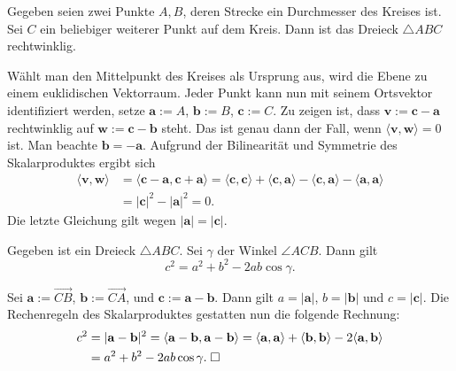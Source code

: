 \newpage
\begin{Satz}\newlinefirst
Gegeben seien zwei Punkte $A,B$, deren Strecke ein Durchmesser
des Kreises ist. Sei $C$ ein beliebiger weiterer Punkt auf dem
Kreis. Dann ist das Dreieck $\triangle ABC$ rechtwinklig.
\end{Satz}
\begin{Beweis}
Wählt man den Mittelpunkt des Kreises als Ursprung aus, wird die
Ebene zu einem euklidischen Vektorraum. Jeder Punkt kann nun mit
seinem Ortsvektor identifiziert werden, setze $\mathbf a := A$,
$\mathbf b := B$, $\mathbf c := C$. Zu zeigen ist, dass
$\mathbf v:=\mathbf c-\mathbf a$ rechtwinklig auf
$\mathbf w:=\mathbf c-\mathbf b$  steht. Das ist genau dann der Fall,
wenn $\langle\mathbf v,\mathbf w\rangle = 0$ ist.
Man beachte $\mathbf b = -\mathbf a$. Aufgrund der Bilinearität und
Symmetrie des Skalarproduktes ergibt sich%
\begin{align}
\langle\mathbf v,\mathbf w\rangle
&= \langle\mathbf c-\mathbf a,\mathbf c+\mathbf a\rangle
= \langle\mathbf c,\mathbf c\rangle
+ \langle\mathbf c,\mathbf a\rangle
- \langle\mathbf c,\mathbf a\rangle
- \langle\mathbf a,\mathbf a\rangle\\
&= |\mathbf c|^2-|\mathbf a|^2 = 0.
\end{align}
Die letzte Gleichung gilt wegen $|\mathbf a|=|\mathbf c|$.\;\qedsymbol
\end{Beweis}

\begin{Satz}[Kosinussatz]\label{Kosinussatz}\newlinefirst
Gegeben ist ein Dreieck $\triangle ABC$. Sei $\gamma$ der
Winkel $\angle ACB$. Dann gilt
\[c^2=a^2+b^2-2ab\cos\gamma.\]
\end{Satz}
\begin{Beweis}
Sei $\mathbf a := \overrightarrow{CB}$,
$\mathbf b := \overrightarrow{CA}$,
und $\mathbf c := \mathbf a-\mathbf b$.
Dann gilt $a=|\mathbf a|$, $b=|\mathbf b|$ und $c=|\mathbf c|$.
Die Rechenregeln des Skalarproduktes gestatten nun die
folgende Rechnung:
\begin{align}
c^2 &= |\mathbf a-\mathbf b|^2
= \langle\mathbf a-\mathbf b,\mathbf a-\mathbf b\rangle
= \langle\mathbf a,\mathbf a\rangle
+ \langle\mathbf b,\mathbf b\rangle
- 2\langle\mathbf a,\mathbf b\rangle\\
&= a^2+b^2-2ab\cos\gamma.\;\square
\end{align}
\end{Beweis}

